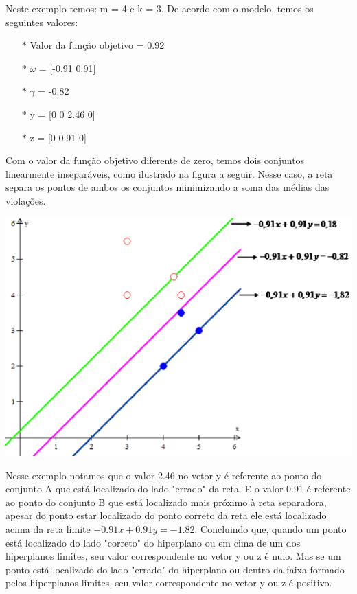 Neste exemplo temos: m = 4 e k = 3. De acordo com o modelo, temos os seguintes valores:
\begin{itemize}
\item[$\ast$] Valor da função objetivo = 0.92
\item[$\ast$] $\omega$ = [-0.91  0.91]
\item[$\ast$] $\gamma$ = -0.82
\item[$\ast$] y = [0 0 2.46 0]
\item[$\ast$] z = [0 0.91 0]
\end{itemize}

Com o valor da função objetivo diferente de zero, temos dois conjuntos linearmente inseparáveis, como ilustrado na figura a seguir. Nesse caso, a reta separa os pontos de ambos os conjuntos minimizando a soma das médias das violações.

\begin{center}
	\includegraphics[scale=0.5]{graficos/exemplo1}
	\label{img:ex2}
\end{center}

Nesse exemplo notamos que o valor 2.46 no vetor y é referente ao ponto do conjunto A que está localizado do lado "errado" da reta. E o valor 0.91 é referente ao ponto do conjunto B que está localizado mais próximo à reta separadora, apesar do ponto estar localizado do ponto correto da reta ele está localizado acima da reta limite $-0.91x + 0.91y = -1.82$. Concluindo que, quando um ponto está localizado do lado "correto" do hiperplano ou em cima de um dos hiperplanos limites, seu valor correspondente no vetor y ou z é nulo. Mas se um ponto está localizado do lado "errado" do hiperplano ou dentro da faixa formado pelos hiperplanos limites, seu valor correspondente no vetor y ou z é positivo.

